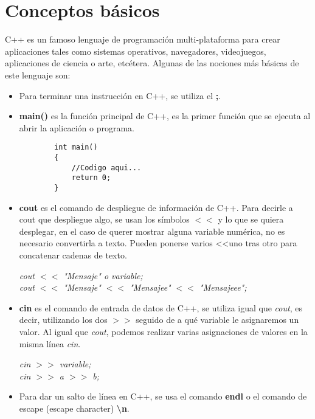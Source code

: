 \section{Conceptos básicos}
\hspace{0.55cm}C++ es un famoso lenguaje de programación multi-plataforma para crear aplicaciones tales como sistemas operativos, navegadores, videojuegos, aplicaciones de ciencia o arte, etcétera. Algunas de las nociones más básicas de este lenguaje son:
\begin{itemize}
    \item Para terminar una instrucción en C++, se utiliza el \textbf{;}.
    \item \textbf{main()} es la función principal de C++, es la primer función que se ejecuta al abrir la aplicación o programa.
    \begin{lstlisting}
        int main()
        {
            //Codigo aqui...
            return 0;
        }
    \end{lstlisting}
    \item \textbf{cout} es el comando de despliegue de información de C++. Para decirle a cout que despliegue algo, se usan los símbolos \textbf{$<<$} y lo que se quiera desplegar, en el caso de querer mostrar alguna variable numérica, no es necesario convertirla a texto. Pueden ponerse varios \textless\textless uno tras otro para concatenar cadenas de texto.
    \begin{center}
        \textit{
            cout $<<$ "Mensaje" o variable; \\
            cout $<<$ "Mensaje" $<<$ "Mensajee" $<<$ "Mensajeee";
        }
    \end{center}
    \item \textbf{cin} es el comando de entrada de datos de C++, se utiliza igual que \textit{cout}, es decir, utilizando los dos \textbf{$>>$} seguido de a qué variable le asignaremos un valor. Al igual que \textit{cout}, podemos realizar varias asignaciones de valores en la misma línea \textit{cin}.
    \begin{center}
        \textit{
            cin $>>$ variable; \\
            cin $>>$ a $>>$ b;
        }
    \end{center}
    \item Para dar un salto de línea en C++, se usa el comando \textbf{endl} o el comando de escape (escape character) \textbf{\textbackslash n}.
\end{itemize}

